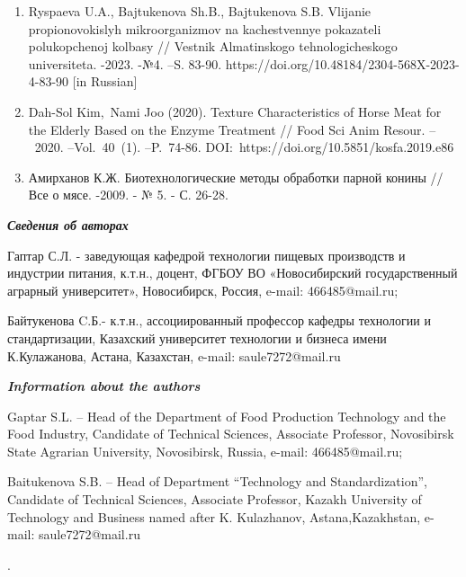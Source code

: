 \begin{enumerate}
  Primenenie metodov biotehnologii v mjasnoj promyshlennosti // Vestnik
  Juzhno-Ural\textquotesingle skogo gosudarstvennogo universiteta.
  -2017. -Tom 5. -№ 3. -S. 21-28. doı:10.14529/food170303 {[}in
  Russian{]}
\item
  Ryspaeva U.A., Bajtukenova Sh.B., Bajtukenova S.B. Vlijanie
  propionovokislyh mikroorganizmov na kachestvennye pokazateli
  polukopchenoj kolbasy // Vestnik Almatinskogo tehnologicheskogo
  universiteta. -2023. -№4. --S. 83-90.
  https://doi.org/10.48184/2304-568X-2023-4-83-90 {[}in Russian{]}
\item
  Dah-Sol Kim,~Nami Joo (2020). Texture Characteristics of Horse Meat
  for the Elderly Based on the Enzyme Treatment // Food Sci Anim Resour.
  --~2020. --Vol.~40~(1). --P.~74-86.
  DOI:~https://doi.org/10.5851/kosfa.2019.e86
\item
  Амирханов К.Ж. Биотехнологические методы обработки парной конины //
  Все о мясе. -2009. - № 5. - С. 26-28.
\end{enumerate}

\emph{{\bfseries Сведения об авторах}}

Гаптар С.Л. - заведующая кафедрой технологии пищевых производств и
индустрии питания, к.т.н., доцент, ФГБОУ ВО «Новосибирский
государственный аграрный университет», Новосибирск, Россия, e-mail:
466485@mail.ru;

Байтукенова C.Б.- к.т.н., ассоциированный профессор кафедры технологии и
стандартизации, Казахский университет технологии и бизнеса имени
К.Кулажанова, Астана, Казахстан, e-mail: saule7272@mail.ru

\emph{{\bfseries Information about the authors}}

Gaptar S.L. -- Head of the Department of Food Production Technology and
the Food Industry, Candidate of Technical Sciences, Associate Professor,
Novosibirsk State Agrarian University, Novosibirsk, Russia, e-mail:
466485@mail.ru;

Baitukenova S.B. -- Head of Department ``Technology and
Standardization'', Candidate of Technical Sciences, Associate Professor,
Kazakh University of Technology and Business named after K. Kulazhanov,
Astana,Kazakhstan, e-mail: saule7272@mail.ru

.